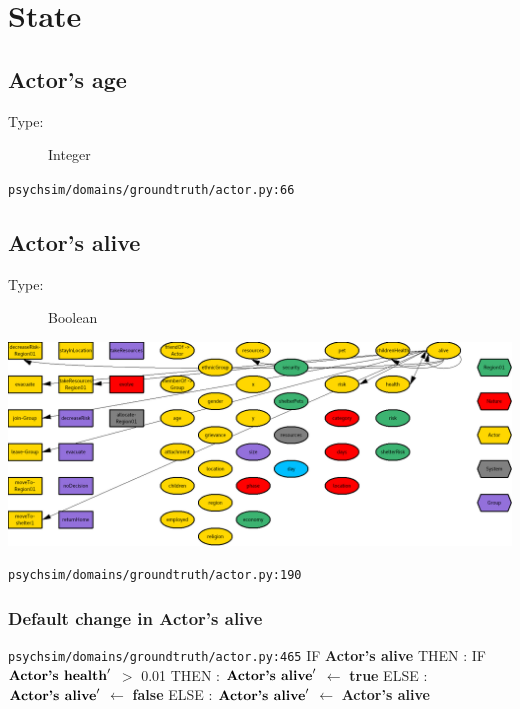 \documentclass{article}%
\begin{document}
%
\section{State}%
\label{sec:State}%
\subsection{Actor's age}%
\label{subsec:Actor's age}%
\begin{description}%
\item[Type:]%
Integer%
\end{description}%
\begin{flushleft}%
\verb|psychsim/domains/groundtruth/actor.py:66|%
\end{flushleft}

%
\subsection{Actor's alive}%
\label{subsec:Actor's alive}%
\begin{description}%
\item[Type:]%
Boolean%
\end{description}%
\includegraphics[width=\textwidth]{images/aliveOfActor.png}%
\begin{flushleft}%
\verb|psychsim/domains/groundtruth/actor.py:190|%
\end{flushleft}%
\subsubsection{Default change in Actor's alive}%
\label{ssubsec:Default change in Actor's alive}%
\begin{flushleft}%
\verb|psychsim/domains/groundtruth/actor.py:465|%
\linebreak%
IF %
\textbf{Actor's alive}%
\linebreak%
\hspace*{2em}%
THEN %
: %
IF %
$\mbox{\textbf{Actor's health}} '$%
$>$%
0.01%
\linebreak%
\hspace*{4em}%
THEN %
: %
$\mbox{\textbf{Actor's alive}} '$%
$\leftarrow$%
\textbf{true}%
\linebreak%
\hspace*{4em}%
ELSE %
: %
$\mbox{\textbf{Actor's alive}} '$%
$\leftarrow$%
\textbf{false}%
\linebreak%
\hspace*{2em}%
ELSE %
: %
$\mbox{\textbf{Actor's alive}} '$%
$\leftarrow$%
\textbf{Actor's alive}%
\end{flushleft}
\end{document}
